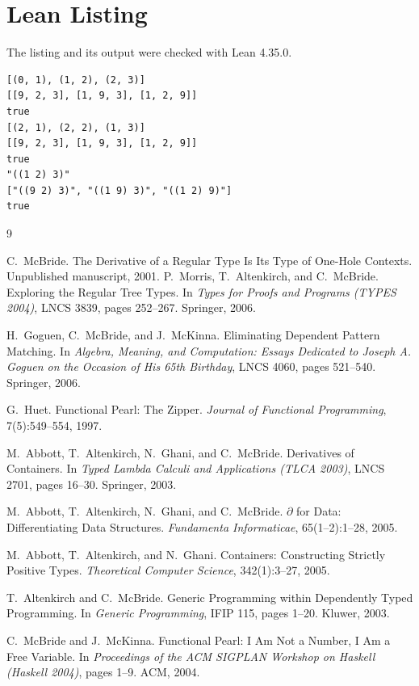 \documentclass[11pt]{article}
\begin{document}
\appendix

\section{Lean Listing}

The listing and its output were checked with Lean 4.35.0.


\begin{footnotesize}
\begin{verbatim}
[(0, 1), (1, 2), (2, 3)]
[[9, 2, 3], [1, 9, 3], [1, 2, 9]]
true
[(2, 1), (2, 2), (1, 3)]
[[9, 2, 3], [1, 9, 3], [1, 2, 9]]
true
"((1 2) 3)"
["((9 2) 3)", "((1 9) 3)", "((1 2) 9)"]
true
\end{verbatim}
\end{footnotesize}

\begin{thebibliography}{9}

C.~McBride.
\newblock The Derivative of a Regular Type Is Its Type of One-Hole Contexts.
\newblock Unpublished manuscript, 2001.
P.~Morris, T.~Altenkirch, and C.~McBride.
\newblock Exploring the Regular Tree Types.
\newblock In \emph{Types for Proofs and Programs (TYPES 2004)}, LNCS 3839, pages 252--267. Springer, 2006.

H.~Goguen, C.~McBride, and J.~McKinna.
\newblock Eliminating Dependent Pattern Matching.
\newblock In \emph{Algebra, Meaning, and Computation: Essays Dedicated to Joseph A. Goguen on the Occasion of His 65th Birthday}, LNCS 4060, pages 521--540. Springer, 2006.

G.~Huet.
\newblock Functional Pearl: The Zipper.
\newblock \emph{Journal of Functional Programming}, 7(5):549--554, 1997.

M.~Abbott, T.~Altenkirch, N.~Ghani, and C.~McBride.
\newblock Derivatives of Containers.
\newblock In \emph{Typed Lambda Calculi and Applications (TLCA 2003)}, LNCS 2701, pages 16--30. Springer, 2003.

M.~Abbott, T.~Altenkirch, N.~Ghani, and C.~McBride.
\newblock $\partial$ for Data: Differentiating Data Structures.
\newblock \emph{Fundamenta Informaticae}, 65(1--2):1--28, 2005.

M.~Abbott, T.~Altenkirch, and N.~Ghani.
\newblock Containers: Constructing Strictly Positive Types.
\newblock \emph{Theoretical Computer Science}, 342(1):3--27, 2005.

T.~Altenkirch and C.~McBride.
\newblock Generic Programming within Dependently Typed Programming.
\newblock In \emph{Generic Programming}, IFIP 115, pages 1--20. Kluwer, 2003.

C.~McBride and J.~McKinna.
\newblock Functional Pearl: I Am Not a Number, I Am a Free Variable.
\newblock In \emph{Proceedings of the ACM SIGPLAN Workshop on Haskell (Haskell 2004)}, pages 1--9. ACM, 2004.

\end{thebibliography}
\end{document}
